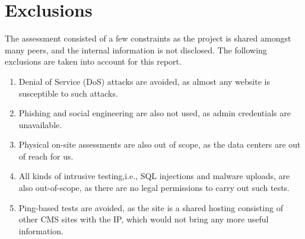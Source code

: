 \chapter{Exclusions}
The assessment consisted of a few constraints as the project is shared amongst many peers, and the internal information is not disclosed. The following exclusions are taken into account for this report.
\begin{enumerate}
    \item Denial of Service (DoS) attacks are avoided, as almost any website is susceptible to such attacks.
    \item Phishing and social engineering are also not used, as admin credentials are unavailable.
    \item Physical on-site assessments are also out of scope, as the data centers are out of reach for us.
    \item All kinds of intrusive testing,i.e., SQL injections and malware uploads, are also out-of-scope, as there are no legal permissions to carry out such tests.
    \item Ping-based tests are avoided, as the site is a shared hosting consisting of other CMS sites with the IP, which would not bring any more useful information.
\end{enumerate}